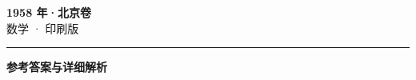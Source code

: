 \documentclass[zihao=5, a4paper]{ctexart}
\begin{document}
\begin{center}
  {\Large\bfseries 1958 年·北京卷}\\[4pt]
  {\large 数学 · 印刷版}
\end{center}
\medskip
{}

\par\bigskip\hrule\bigskip
{}
\begin{center}{\large\bfseries 参考答案与详细解析}\end{center}
\smallskip

\end{document}
